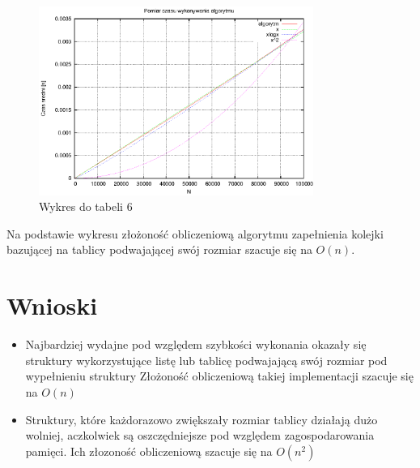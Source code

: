 \documentclass[a4paper,11pt]{article}
\begin{document}
\begin{enumerate}
\begin{table}[th]
\begin{tabular}{|l|l|l|}
\hline
    \end{tabular}
    \end{table}
    \newpage
\begin{figure}[th]
\centering
\includegraphics[width=0.8\textwidth]{wykres6.eps}
\caption{Wykres do tabeli 6}
\label{Wykres do tabeli 6}
\end{figure} 
Na podstawie wykresu złożoność obliczeniową algorytmu zapełnienia kolejki bazującej na tablicy podwajającej swój rozmiar szacuje się na $ O(n) $.
\end{enumerate}

\section{Wnioski}

\begin{itemize}
\item Najbardziej wydajne pod względem szybkości wykonania okazały się struktury wykorzystujące listę lub tablicę podwajającą swój rozmiar pod wypełnieniu struktury
Złożoność obliczeniową takiej implementacji szacuje się na $ O(n) $
\item Struktury, które każdorazowo zwiększały rozmiar tablicy działają dużo wolniej, aczkolwiek są oszczędniejsze pod względem zagospodarowania pamięci.
Ich złozoność obliczeniową szacuje się na $ O(n^{2}) $
\end{itemize}
\end{document}
